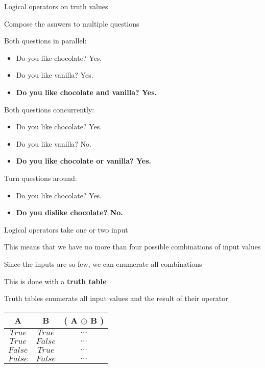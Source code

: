 \documentclass{beamer}
\begin{document}
\begin{slide}{
\item Logical operators on truth values
\item Compose the asnwers to multiple questions
\item Both questions in parallel:
\begin{itemize}
\item Do you like chocolate? Yes.
\item Do you like vanilla? Yes.
\item \textbf{Do you like chocolate and vanilla? Yes.}
\end{itemize}
\item Both questions concurrently:
\begin{itemize}
\item Do you like chocolate? Yes.
\item Do you like vanilla? No.
\item \textbf{Do you like chocolate or vanilla? Yes.}
\end{itemize}
\item Turn questions around:
\begin{itemize}
\item Do you like chocolate? Yes.
\item \textbf{Do you dislike chocolate? No.}
\end{itemize}
}\end{slide}

\begin{slide}{
\item Logical operators take one or two input
\item This means that we have no more than four possible combinations of input values
\item Since the inputs are so few, we can enumerate all combinations
\item This is done with a \textbf{truth table}
}\end{slide}

\begin{slide}{
\item Truth tables enumerate all input values and the result of their operator
\begin{tabular}{c c c}
A & B & ( A $\odot$ B ) \\
\hline 
$True$ & $True$ &  $\dots$ \\
$True$ & $False$ &  $\dots$ \\
$False$ & $True$ &  $\dots$ \\
$False$ & $False$ &  $\dots$ \\
\end{tabular}
}\end{slide}
\end{document}
